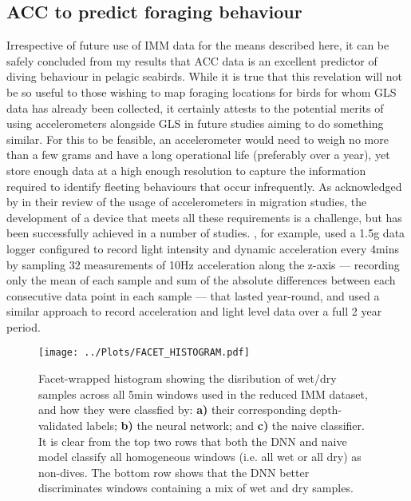 \documentclass[11pt]{article}
\begin{document}
    \subsection{ACC to predict foraging behaviour}
    Irrespective of future use of IMM data for the means described here, it can be safely concluded from my results that ACC data is an excellent predictor of diving behaviour in pelagic seabirds. While it is true that this revelation will not be so useful to those wishing to map foraging locations for birds for whom GLS data has already been collected, it certainly attests to the potential merits of using accelerometers alongside GLS in future studies aiming to do something similar. For this to be feasible, an accelerometer would need to weigh no more than a few grams and have a long operational life (preferably over a year), yet store enough data at a high enough resolution to capture the information required to identify fleeting behaviours that occur infrequently.
    As acknowledged by \cite{backman2017actogram} in their review of the usage of accelerometers in migration studies, the development of a device that meets all these requirements is a challenge, but has been successfully achieved in a number of studies. \cite{liechti2013first}, for example, used a 1.5g data logger configured to record light intensity and dynamic acceleration every 4mins by sampling 32 measurements of 10Hz acceleration along the z-axis — recording only the mean of each sample and sum of the absolute differences between each consecutive data point in each sample — that lasted year-round, and \cite{hedenstrom2016annual} used a similar approach to record acceleration and light level data over a full 2 year period.
    
    \begin{figure}[t!]
	    \centering\texttt{[image: ../Plots/FACET\_HISTOGRAM.pdf]}
	    \caption{Facet-wrapped histogram showing the disribution of wet/dry samples across all 5min windows used in the reduced IMM dataset, and how they were classfied by: \textbf{a)} their corresponding depth-validated labels; \textbf{b)} the neural network; and \textbf{c)} the naive classifier. It is clear from the top two rows that both the DNN and naive model classify all homogeneous windows (i.e. all wet or all dry) as non-dives. The bottom row shows that the DNN better discriminates windows containing a mix of wet and dry samples.}
    \end{figure}
    
\end{document}
